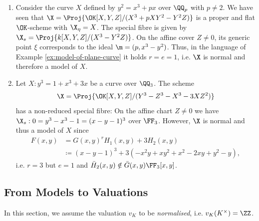 \begin{example}\label{ex:particular-model-of-plane-curve}
    \begin{enumerate}
        \item Consider the curve $X$ defined by $y^2 = x^3 + px$ over $\QQ_p$ with $p \neq 2$.
            We have seen that $\X = \Proj{\OK[X,Y,Z]/(X^3 + pXY^2 - Y^2Z)}$ is a proper and flat $\OK$-scheme with $\X_\eta = X$.
            The special fibre is given by $\X_s = \Proj{k[X,Y,Z]/(X^3 - Y^2Z)}$.
            On the affine cover $Z\neq 0$, its generic point $\xi$ corresponds to the ideal $\m = (p, x^3-y^2)$.
            Thus, in the language of Example \ref{ex:model-of-plane-curve} it holds $r=e=1$, i.e. $\X$ is normal and therefore a model of $X$.
        \item Let $X: y^3 = 1 + x^3 + 3x$ be a curve over $\QQ_3$.
            The scheme 
            \begin{align}
                \X = \Proj{\OK[X,Y,Z]/(Y^3 - Z^3 - X^3 - 3XZ^2)}
            \end{align}
            has a non-reduced special fibre:
            On the affine chart $Z \neq 0$ we have $\X_s: 0 = y^3 - x^3 - 1 = (x - y - 1)^3$ over $\FF_3$.
            However, $\X$ is normal and thus a model of $X$ since
            \begin{align*}
                F(x,y) &= G(x,y)^r H_1(x,y) + 3 H_2(x,y) \\
                    &\coloneqq (x-y-1)^3 + 3(-x^2y + xy^2 + x^2 - 2xy + y^2 - y),
            \end{align*}
            i.e. $r=3$ but $e=1$ and $\bar{H}_2(x,y) \notin \bar{G}(x,y)\FF_3[x,y]$.
    \end{enumerate}
\end{example}


\subsection{From Models to Valuations} \label{subsec:from-valuations-to-models}
In this section, we assume the valuation $v_K$ to be \textit{normalised}, i.e. $v_K(K^\times) = \ZZ$.

